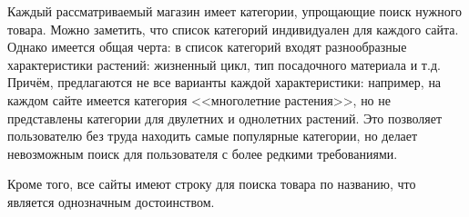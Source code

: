 Каждый рассматриваемый магазин имеет категории, упрощающие поиск нужного товара. Можно заметить, что список категорий индивидуален для каждого сайта. Однако имеется общая черта: в список категорий входят разнообразные характеристики растений: жизненный цикл, тип посадочного материала и т.д. Причём, предлагаются не все варианты каждой характеристики: например, на каждом сайте имеется категория <<многолетние растения>>, но не представлены категории для двулетних и однолетних растений. Это позволяет пользователю без труда находить самые популярные категории,  но делает невозможным поиск для пользователя с более редкими требованиями.

Кроме того, все сайты имеют строку для поиска товара по названию, что является однозначным достоинством.

